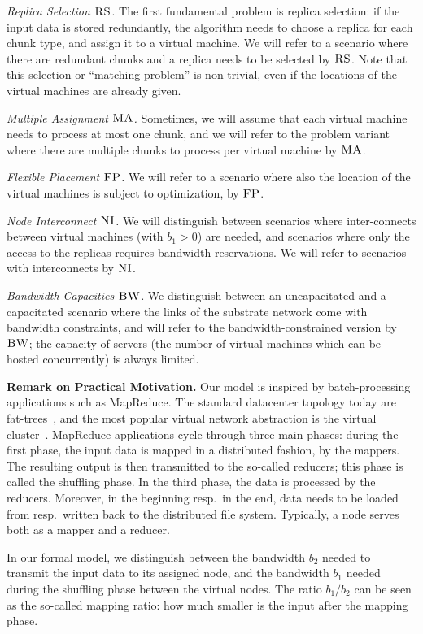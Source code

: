 \documentclass[9pt,twocolumn]{scrartcl}
\newcommand{\CC}{\textsc{NI}}
\newcommand{\FP}{\textsc{FP}}
\newcommand{\RS}{\textsc{RS}}
\newcommand{\BW}{\textsc{BW}}
\newcommand{\MA}{\textsc{MA}}
\newcommand{\CostCom}{\ensuremath{b_1}}
\newcommand{\CostTrans}{\ensuremath{b_2}}
\begin{document}
\emph{Replica Selection $\RS$.} The first fundamental problem is replica selection: 
if the input data is stored redundantly, the algorithm needs to choose a replica
for each chunk type, and assign it to a virtual machine. We will refer to a scenario
where there are redundant chunks and a replica needs to be selected by $\RS$. Note that this
selection or ``matching problem'' is non-trivial, even if the locations of the virtual machines
are already given. 

\emph{Multiple Assignment $\MA$.} Sometimes, we will assume that each virtual machine
needs to process at most one chunk, and we will refer to the problem variant where there are multiple chunks to process per virtual 
machine by $\MA$. 

\emph{Flexible Placement $\FP$.} We will refer to a scenario where also the location of the virtual machines is subject to optimization,
by $\FP$.

\emph{Node Interconnect $\CC$.} We will distinguish between scenarios where inter-connects between virtual machines (with $\CostCom>0$) are needed,
 and scenarios where only the access to the replicas requires bandwidth reservations. We will refer to scenarios
  with interconnects by $\CC$. 

\emph{Bandwidth Capacities $\BW$.} We distinguish between an uncapacitated and a capacitated scenario where the links 
of the substrate network come with bandwidth
constraints, and will refer to the bandwidth-constrained version by $\BW$; the capacity of servers
(the number of virtual machines which can be hosted concurrently) is always limited.


\textbf{Remark on Practical Motivation.}
Our model is inspired by batch-processing applications such as MapReduce.
The standard datacenter topology today are fat-trees~\cite{fattree},
and the most popular virtual network abstraction is the virtual cluster~\cite{oktopus}.
MapReduce applications cycle through three main phases: during the first phase,
the input data is mapped in a distributed fashion, by the mappers.
The resulting output is then transmitted to the so-called reducers; this phase is
called the shuffling phase. In the third phase, the data is processed by the reducers.
Moreover, in the beginning resp.~in the end, data needs to be loaded from resp.~written
back to the distributed file system.
Typically, a node serves both as a mapper and a reducer.

In our formal model, we distinguish between the bandwidth $\CostTrans$ needed to
transmit the input data to its assigned node, and the bandwidth $\CostCom$
needed during the shuffling phase between the virtual nodes.
The ratio $\CostCom/\CostTrans$ can be seen as the so-called mapping ratio:
how much smaller is the input after the mapping phase.
\end{document}
